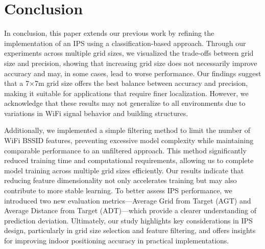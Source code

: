 \documentclass[conference]{IEEEtran}
\begin{document}
	
	
	\section{Conclusion}
	In conclusion, this paper extends our previous work by refining the implementation of an IPS using a classification-based approach. Through our experiments across multiple grid sizes, we visualized the trade-offs between grid size and precision, showing that increasing grid size does not necessarily improve accuracy and may, in some cases, lead to worse performance. Our findings suggest that a 7×7m grid size offers the best balance between accuracy and precision, making it suitable for applications that require finer localization. However, we acknowledge that these results may not generalize to all environments due to variations in WiFi signal behavior and building structures.
	
	Additionally, we implemented a simple filtering method to limit the number of WiFi BSSID features, preventing excessive model complexity while maintaining comparable performance to an unfiltered approach. This method significantly reduced training time and computational requirements, allowing us to complete model training across multiple grid sizes efficiently. Our results indicate that reducing feature dimensionality not only accelerates training but may also contribute to more stable learning. To better assess IPS performance, we introduced two new evaluation metrics—Average Grid from Target (AGT) and Average Distance from Target (ADT)—which provide a clearer understanding of prediction deviation. Ultimately, our study highlights key considerations in IPS design, particularly in grid size selection and feature filtering, and offers insights for improving indoor positioning accuracy in practical implementations.
	
\end{document}
